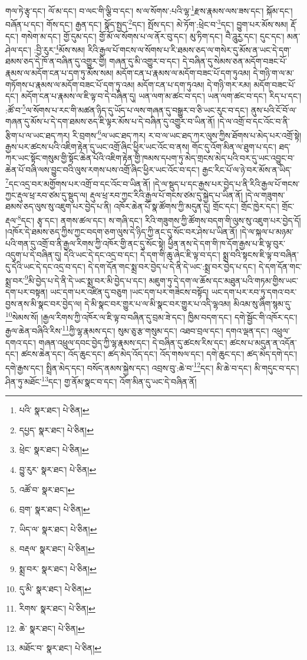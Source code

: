 གལ་ཏེ་རྩྭ་དང་། ལོ་མ་དང་། བ་ལང་གི་ལྕི་བ་དང་། ས་ལ་སོགས་:པའི་ལྷ་\footnote{པའི་  སྣར་ཐང་།  པེ་ཅིན། }རྫས་རྣམས་ལས་ཟས་དང་། སྐོམ་དང་། བཞོན་པ་དང་། གོས་དང་། རྒྱན་དང་། སྣོད་སྤྱད་\footnote{དཔྱད་  སྣར་ཐང་།  པེ་ཅིན། }དང་། སྤོས་དང་། མེ་ཏོག་:ཕྲེང་བ་\footnote{ཕྲེང་  སྣར་ཐང་།  པེ་ཅིན། }དང་། བྱུག་པར་མོས་སམ། རྡོ་དང་། གསེག་མ་དང་། གྱོ་དུམ་དང་། གྱོ་མོ་ལ་སོགས་པ་ལ་ནོར་བུ་དང་། མུ་ཏིག་དང་། བཻ་ཌཱུརྱ་དང་། དུང་དང་། མན་ཤེལ་དང་། :བྱི་རུར་\footnote{བྱུ་རུར་  སྣར་ཐང་།  པེ་ཅིན། }མོས་སམ། རིའི་རྒྱལ་པོ་གངས་ལ་སོགས་པ་རི་ཐམས་ཅད་ལ་གསེར་དུ་མོས་ན་ཡང་དེ་དག་ཐམས་ཅད་དེ་ཁོ་ན་བཞིན་དུ་འགྱུར་གྱི། གཞན་དུ་མི་འགྱུར་བ་དང་། དེ་བཞིན་དུ་སེམས་ཅན་མདོག་བཟང་པོ་རྣམས་ལ་མདོག་ངན་པ་དག་ཏུ་མོས་སམ། མདོག་ངན་པ་རྣམས་ལ་མདོག་བཟང་པོ་དག་ཏུའམ། དེ་གཉི་ག་ལ་མ་གཏོགས་པ་རྣམས་ལ་མདོག་བཟང་པོ་དག་ཏུ་འམ། མདོག་ངན་པ་དག་ཏུའམ། དེ་གཉི་གར་རམ། མདོག་བཟང་པོ་དང་། མདོག་ངན་པ་རྣམས་ལ་ཇི་ལྟ་བ་དེ་བཞིན་དུ། ཡན་ལག་མ་ཚང་བ་དང་། ཡན་ལག་ཚང་བ་དང་། རིད་པ་དང་། :ཚོ་བ་\footnote{འཚོ་བ་  སྣར་ཐང་། }ལ་སོགས་པ་རང་གི་མཚན་ཉིད་དུ་ཡོད་པ་ལས་གཞན་དུ་བསྒྱུར་བ་ཅི་ཡང་རུང་བ་དང་། ནུས་པའི་ངོ་བོ་ལ་གཞན་དུ་མོས་པ་དེ་དག་ཐམས་ཅད་ཇི་ལྟར་མོས་པ་དེ་བཞིན་དུ་འགྱུར་བ་ཡིན་ནོ། །དེ་ལ་འགྲོ་བ་དང་འོང་བ་ནི་རྩིག་པ་ལ་ཡང་ཐད་ཀར། རི་བྲགས་\footnote{བྲག་  སྣར་ཐང་།  པེ་ཅིན། }ལ་ཡང་ཐད་ཀར། ར་བ་ལ་ཡང་ཐད་ཀར་ལུས་ཀྱིས་ཐོགས་པ་མེད་པར་འགྲོ་སྟེ། རྒྱས་པར་ཚངས་པའི་འཇིག་རྟེན་དུ་ཡང་འགྲོ་ཞིང་ཕྱིར་ཡང་འོང་བ་ནས། གོང་དུ་འོག་མིན་ལ་ཐུག་པ་དང་། ཐད་ཀར་ཡང་སྟོང་གསུམ་གྱི་སྟོང་ཆེན་པོའི་འཇིག་རྟེན་གྱི་ཁམས་དཔག་ཏུ་མེད་གྲངས་མེད་པའི་བར་དུ་ཡང་འབྱུང་བ་ཆེན་པོ་བཞི་ལས་བྱུང་བའི་ལུས་རགས་པས་འགྲོ་ཞིང་ཕྱིར་ཡང་འོང་བ་དང་། རྒྱང་རིང་པོ་ལ་ཉེ་བར་མོས་ན་ཡིད་\footnote{ཡིད་ལ་  སྣར་ཐང་།  པེ་ཅིན། }དང་འདྲ་བར་མགྱོགས་པར་འགྲོ་བ་དང་འོང་བ་ཡིན་ནོ། །དེ་ལ་སྡུད་པ་དང་རྒྱས་པར་བྱེད་པ་ནི་རིའི་རྒྱལ་པོ་གངས་ཀྱང་རྡུལ་ཕྲ་རབ་ཙམ་དུ་སྡུད་ལ། རྡུལ་ཕྲ་རབ་ཀྱང་རིའི་རྒྱལ་པོ་གངས་ཙམ་དུ་སྐྱེད་པ་ཡིན་ནོ། །དེ་ལ་གཟུགས་ཐམས་ཅད་ལུས་སུ་འཇུག་པར་བྱེད་པ་ནི། འཁོར་ཆེན་པོ་སྣ་ཚོགས་ཀྱི་མདུན་དུ། གྲོང་དང་། གྲོང་ཁྱེར་དང་། གྲོང་རྡལ་\footnote{བརྡལ་  སྣར་ཐང་།  པེ་ཅིན། }དང་། རྩྭ་དང་། ནགས་ཚལ་དང་། ས་གཞི་དང་། རིའི་གཟུགས་ཀྱི་ཚོགས་བདག་གི་ལུས་སུ་འཇུག་པར་བྱེད་དོ། །འཁོར་དེ་ཐམས་ཅད་ཀྱིས་ཀྱང་བདག་ཅག་ལུས་དེ་ཉིད་ཀྱི་ནང་དུ་སོང་བར་ཤེས་པ་ཡིན་ནོ། །དེ་ལ་སྐལ་པ་མཉམ་པའི་གན་དུ་འགྲོ་བ་ནི་རྒྱལ་རིགས་ཀྱི་འཁོར་གྱི་ནང་དུ་སོང་སྟེ། ཕྱིན་ནས་དེ་དག་གི་ཁ་དོག་རྒྱས་པ་ཇི་ལྟ་བུར་འདུག་པ་དེ་བཞིན་དུ། དེའི་ཡང་དེ་དང་འདྲ་བ་དང་། དེ་དག་གི་ཆུ་ཞེང་ཇི་ལྟ་བ་དང་། སྨྲ་བའི་སྟངས་ཇི་ལྟ་བ་བཞིན་དུ་དེའི་ཡང་དེ་དང་འདྲ་བ་དང་། དེ་དག་དོན་གང་སྨྲ་བར་བྱེད་པ་དེ་ནི་དེ་ཡང་:སྨྲ་བར་བྱེད་པ་དང་། དེ་དག་དོན་གང་སྨྲ་བར་\footnote{སྨྲ་བར་  སྣར་ཐང་།  པེ་ཅིན། }མི་བྱེད་པ་དེ་ནི་དེ་ཡང་སྨྲ་བར་མི་བྱེད་པ་དང་། མཇུག་ཏུ་དེ་དག་ལ་ཆོས་དང་མཐུན་པའི་གཏམ་གྱིས་ཡང་དག་པར་བསྟན། ཡང་དག་པར་འཛིན་དུ་བཅུག །ཡང་དག་པར་གཟེངས་བསྟོད། ཡང་དག་པར་རབ་ཏུ་དགའ་བར་བྱས་ནས་མི་སྣང་བར་བྱེད་ལ། དེ་མི་སྣང་བར་གྱུར་པ་ལ་མི་སྣང་བར་གྱུར་པ་འདི་ལྷའམ། མིའམ་སུ་ཞིག་སྙམ་དུ་\footnote{དུ་མི་  སྣར་ཐང་།  པེ་ཅིན། }སེམས་སོ། །རྒྱལ་རིགས་ཀྱི་འཁོར་ལ་ཇི་ལྟ་བ་བཞིན་དུ་བྲམ་ཟེ་དང་། ཁྱིམ་བདག་དང་། དགེ་སྦྱོང་གི་འཁོར་དང་། རྒྱལ་ཆེན་བཞིའི་རིས་\footnote{རིགས་  སྣར་ཐང་།  པེ་ཅིན། }ཀྱི་ལྷ་རྣམས་དང་། སུམ་ཅུ་རྩ་གསུམ་དང་། འཐབ་བྲལ་དང་། དགའ་ལྡན་དང་། འཕྲུལ་དགའ་དང་། གཞན་འཕྲུལ་དབང་བྱེད་ཀྱི་ལྷ་རྣམས་དང་། དེ་བཞིན་དུ་ཚངས་རིས་དང་། ཚངས་པ་མདུན་ན་འདོན་དང་། ཚངས་ཆེན་དང་། འོད་ཆུང་དང་། ཚད་མེད་འོད་དང་། འོད་གསལ་དང་། དགེ་ཆུང་དང་། ཚད་མེད་དགེ་དང་། དགེ་རྒྱས་དང་། སྤྲིན་མེད་དང་། བསོད་ནམས་སྐྱེས་དང་། འབྲས་བུ་:ཆེ་བ་\footnote{ཆེ་  སྣར་ཐང་།  པེ་ཅིན། }དང་། མི་ཆེ་བ་དང་། མི་གདུང་བ་དང་། ཤིན་ཏུ་མཐོང་\footnote{མཐོང་བ་  སྣར་ཐང་།  པེ་ཅིན། }དང་། གྱ་ནོམ་སྣང་བ་དང་། འོག་མིན་དུ་ཡང་དེ་བཞིན་ནོ། 